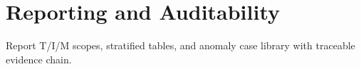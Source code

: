\section{Reporting and Auditability}
Report T/I/M scopes, stratified tables, and anomaly case library with traceable evidence chain.
